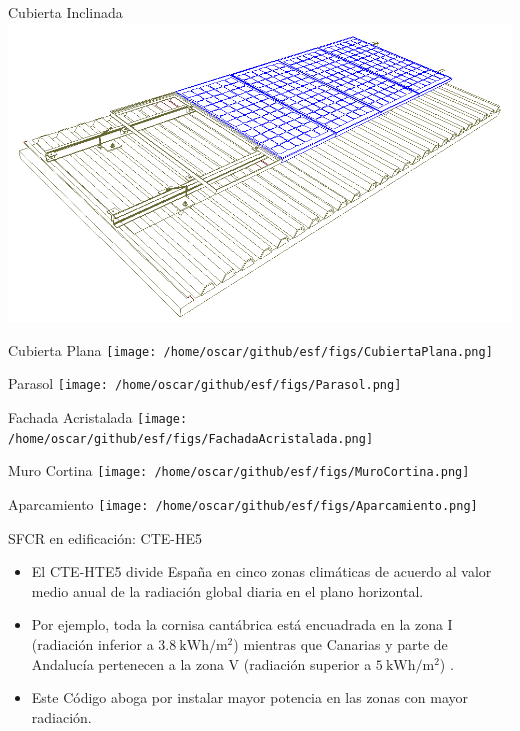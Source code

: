 \documentclass[xcolor={usenames,svgnames,dvipsnames}]{beamer}
\begin{document}
\begin{frame}[label=sec-1-3-10]{Cubierta Inclinada}
\includegraphics[width=.9\linewidth]{../figs/CubiertaInclinada.png}
\end{frame}

\begin{frame}[label=sec-1-3-11]{Cubierta Plana}
\texttt{[image: /home/oscar/github/esf/figs/CubiertaPlana.png]}
\end{frame}

\begin{frame}[label=sec-1-3-12]{Parasol}
\texttt{[image: /home/oscar/github/esf/figs/Parasol.png]}
\end{frame}

\begin{frame}[label=sec-1-3-13]{Fachada Acristalada}
\texttt{[image: /home/oscar/github/esf/figs/FachadaAcristalada.png]}
\end{frame}

\begin{frame}[label=sec-1-3-14]{Muro Cortina}
\texttt{[image: /home/oscar/github/esf/figs/MuroCortina.png]}
\end{frame}

\begin{frame}[label=sec-1-3-15]{Aparcamiento}
\texttt{[image: /home/oscar/github/esf/figs/Aparcamiento.png]}
\end{frame}


\begin{frame}[label=sec-1-3-16]{SFCR en edificación: CTE-HE5}
\begin{itemize}
\item El CTE-HTE5 divide España en cinco zonas climáticas de acuerdo al valor medio anual de la radiación global diaria en el plano horizontal.

\item Por ejemplo, toda la cornisa cantábrica está encuadrada en la zona I (radiación inferior a $\SI{3.8}{\kWh\per\meter\squared}$) mientras que Canarias y parte de Andalucía pertenecen a la zona V (radiación superior a $\SI{5}{\kWh\per\meter\squared}$) .

\item Este Código aboga por instalar mayor potencia en las zonas con mayor radiación.
\end{itemize}
\end{frame}
\end{document}
